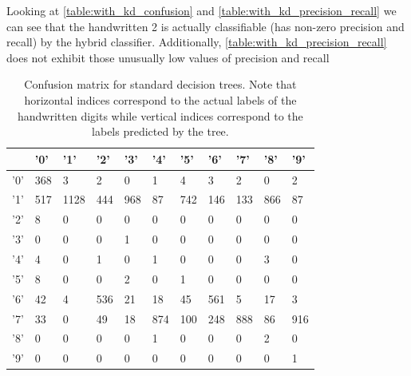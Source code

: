 Looking at \ref{table:with_kd_confusion} and \ref{table:with_kd_precision_recall} we can see that the handwritten 2 is actually classifiable (has non-zero precision and recall) by the hybrid classifier.  Additionally, \ref{table:with_kd_precision_recall} does not exhibit those unusually low values of precision and recall

\begin{table}
	\begin{tabular}{l|llllllllll}
		&   '0' &   '1' &   '2' &   '3' &   '4' &   '5' &   '6' &   '7' &   '8' &   '9' \\
		\hline
		'0' &   368 &     3 &     2 &     0 &     1 &     4 &     3 &     2 &     0 &     2 \\
		'1' &   517 &  1128 &   444 &   968 &    87 &   742 &   146 &   133 &   866 &    87 \\
		'2' &     8 &     0 &     0 &     0 &     0 &     0 &     0 &     0 &     0 &     0 \\
		'3' &     0 &     0 &     0 &     1 &     0 &     0 &     0 &     0 &     0 &     0 \\
		'4' &     4 &     0 &     1 &     0 &     1 &     0 &     0 &     0 &     3 &     0 \\
		'5' &     8 &     0 &     0 &     2 &     0 &     1 &     0 &     0 &     0 &     0 \\
		'6' &    42 &     4 &   536 &    21 &    18 &    45 &   561 &     5 &    17 &     3 \\
		'7' &    33 &     0 &    49 &    18 &   874 &   100 &   248 &   888 &    86 &   916 \\
		'8' &     0 &     0 &     0 &     0 &     1 &     0 &     0 &     0 &     2 &     0 \\
		'9' &     0 &     0 &     0 &     0 &     0 &     0 &     0 &     0 &     0 &     1 \\
	\end{tabular}
	\caption{Confusion matrix for standard decision trees.  Note that horizontal indices correspond to the actual labels of the handwritten digits while vertical indices correspond to the labels predicted by the tree.}
	\label{table:no_kd_confusion}
\end{table}

